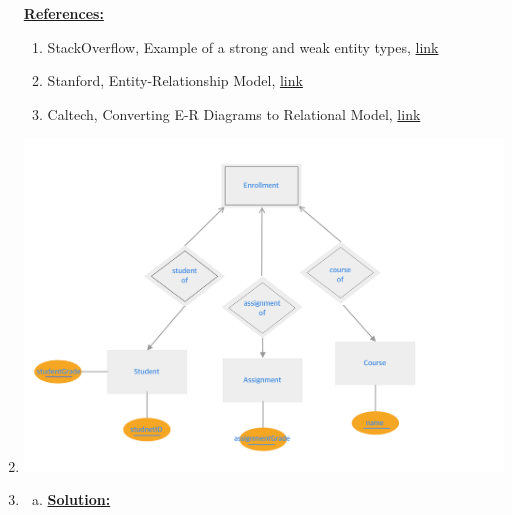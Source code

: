 \documentclass[12pt]{article}
\begin{document}
\begin{enumerate}[1.]
\begin{itemize}
    \end{itemize}

    \bigskip

    \underline{\textbf{References:}}

    \bigskip

    \begin{enumerate}[1)]
        \item StackOverflow, Example of a strong and weak entity types, \href{https://stackoverflow.com/questions/4741967/example-of-a-strong-and-weak-entity-types}{link}
        \item Stanford, Entity-Relationship Model, \href{http://infolab.stanford.edu/~ullman/fcdb/aut07/slides/er.pdf}{link}
        \item Caltech, Converting E-R Diagrams to Relational Model, \href{http://users.cms.caltech.edu/~donnie/dbcourse/intro0607/lectures/Lecture17.pdf}{link}
    \end{enumerate}


    \item

    \begin{center}
    \includegraphics[width=\linewidth]{images/worksheet_14_solution_58.png}
    \end{center}

    \item

    \begin{enumerate}[a)]
        \item

        \underline{\textbf{Solution:}}


\end{enumerate}
\end{enumerate}
\end{document}
